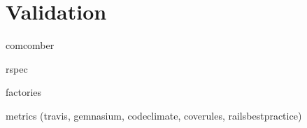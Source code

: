 \chapter{Validation}
comcomber

rspec

factories

metrics (travis, gemnasium, codeclimate, coverules, railsbestpractice)
